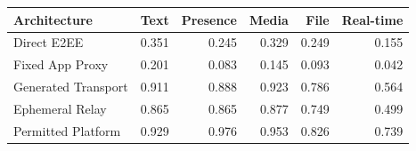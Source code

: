 \begin{tabular}{lrrrrr}
\toprule
Architecture & Text & Presence & Media & File & Real-time \\
\midrule
Direct E2EE & 0.351 & 0.245 & 0.329 & 0.249 & 0.155 \\
Fixed App Proxy & 0.201 & 0.083 & 0.145 & 0.093 & 0.042 \\
Generated Transport & 0.911 & 0.888 & 0.923 & 0.786 & 0.564 \\
Ephemeral Relay & 0.865 & 0.865 & 0.877 & 0.749 & 0.499 \\
Permitted Platform & 0.929 & 0.976 & 0.953 & 0.826 & 0.739 \\
\bottomrule
\end{tabular}
